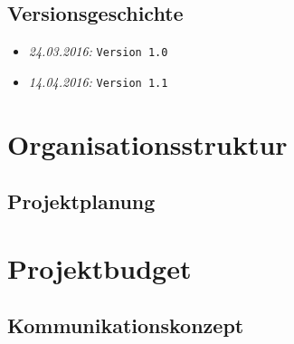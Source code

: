 \documentclass{fhnwreport/fhnwreport}
\begin{document}


\tableofcontents
\vspace{120mm}
\subsection*{Versionsgeschichte}
\begin{itemize}
    \item[]
        \emph{24.03.2016:} \texttt{Version 1.0}
    \item[]
        \emph{14.04.2016:} \texttt{Version 1.1}
\end{itemize}
\clearpage

\section{Organisationsstruktur}
\label{sec:organisatsionsstruktur}


\clearpage
\begin{landscape}
\section{Projektplanung}
\label{sec:projektplanung}

\end{landscape}

\clearpage
\section{Projektbudget}
\label{sec:Projektbudget}


\clearpage
\begin{landscape}
\section{Kommunikationskonzept}
\label{sec:kommunikationskonzept}

\end{landscape}
\end{document}
